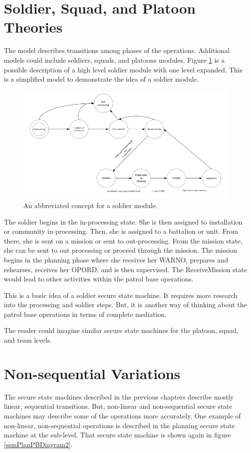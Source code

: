 \documentclass[../../main/main.tex]{subfiles}
\begin{document}
 \section{Soldier, Squad, and Platoon Theories}
The model describes transitions among phases of the operations.  Additional models could include soldiers, squads, and platoons modules.  Figure \ref{soldierMission} is a possible description of a high level soldier module with one level expanded.  This is a simplified model to demonstrate the idea of a soldier module.  

\begin{figure}[h]
\includegraphics[width=\textwidth]{../figures/soldierMission}
\caption{\label{soldierMission}An abbreviated concept for a soldier module.}
\end{figure}

The soldier begins in the in-processing state.  She is then assigned to installation or community in-processing.  Then, she is assigned to a battalion or unit.  From there, she is sent on a mission or sent to out-processing.  From the mission state, she can be sent to out processing or proceed through the mission.  The mission begins in the planning phase where she receives her WARNO, prepares and rehearses, receives her OPORD, and is then supervised.  The ReceiveMission state would lead to other activities within the patrol base operations.

This is a basic idea of a soldier secure state machine.  It requires more research into the processing and soldier steps.  But, it is another way of thinking about the patrol base operations in terms of complete mediation.

The reader could imagine similar secure state machines for the platoon, squad, and team levels.  

 \section{Non-sequential Variations}
 The secure state machines described in the previous chapters describe mostly linear, sequential transitions.  But, non-linear and non-sequential secure state machines may describe some of the operations more accurately.  One example of non-linear, non-sequential operations is described in the planning secure state machine at the sub-level.  That secure state machine is shown again in figure \ref{ssmPlanPBDiagram2}.
 
\end{document}
